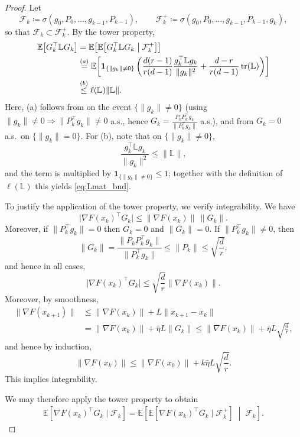 \documentclass[10pt]{article}
\begin{document}
\begin{proof}
Let
\[
\mathcal{F}_k \coloneqq \sigma(g_0,P_0,\dots,g_{k-1},P_{k-1}),
\qquad
\mathcal{F}_k^+ \coloneqq \sigma(g_0,P_0,\dots,g_{k-1},P_{k-1},g_k),
\]
so that $\mathcal{F}_k \subset \mathcal{F}_k^+$.
By the tower property,
\begin{align}
\mathbb{E}\!\left[
G_k^\top \mathbb{L} G_k
\right]
&=
\mathbb{E}\!\left[
\mathbb{E}\!\left[
G_k^\top \mathbb{L} G_k
\;\middle|\;
\mathcal{F}_k^+
\right]
\right]
\notag\\
&\overset{(a)}{=}
\mathbb{E}\!\left[
\mathbf{1}_{\{\|g_k\|\neq 0\}}
\left(
\frac{d(r-1)}{r(d-1)}\frac{g_k^\top \mathbb{L} g_k}{\|g_k\|^2}
+\frac{d-r}{r(d-1)}\operatorname{tr}(\mathbb{L})
\right)
\right]
\notag\\
&\overset{(b)}{\leq}
\ell(\mathbb{L})\|\mathbb{L}\|.
\label{eq:Lmat_bnd}
\end{align}
Here, (a) follows from  on the event $\{\|g_k\|\neq0\}$
(using $\|g_k\|\neq 0 \Rightarrow \|P_k^\top g_k\|\neq 0$ a.s., hence
$G_k=\frac{P_kP_k^\top g_k}{\|P_k^\top g_k\|}$ a.s.), and from $G_k=0$ a.s.\ on
$\{\|g_k\|=0\}$.
For (b), note that on $\{\|g_k\|\neq0\}$,
\[
\frac{g_k^\top \mathbb{L} g_k}{\|g_k\|^2}\le \|\mathbb{L}\|,
\]
and the term is multiplied by $\mathbf{1}_{\{\|g_k\|\neq 0\}}\le 1$; together with
the definition of $\ell(\mathbb{L})$ this yields \eqref{eq:Lmat_bnd}.

To justify the application of the tower property, we verify integrability.
We have
\[
\bigl|\nabla F(x_k)^\top G_k\bigr|
\le
\|\nabla F(x_k)\|\,\|G_k\|.
\]
Moreover, if $\|P_k^\top g_k\|=0$ then $G_k=0$ and $\|G_k\|=0$.
If $\|P_k^\top g_k\|\neq0$, then
\[
\|G_k\|
=
\frac{\|P_kP_k^\top g_k\|}{\|P_k^\top g_k\|}
\le
\|P_k\|
\le
\sqrt{\frac{d}{r}},
\]
and hence in all cases,
\[
\bigl|\nabla F(x_k)^\top G_k\bigr|
\le
\sqrt{\frac{d}{r}}\|\nabla F(x_k)\|.
\]
Moreover, by smoothness,
\begin{align*}
\|\nabla F(x_{k+1})\|
&\le
\|\nabla F(x_k)\|
+ L\|x_{k+1}-x_k\| \\
&=
\|\nabla F(x_k)\|
+ \bar{\eta}L\|G_k\|
\le
\|\nabla F(x_k)\|
+ \bar{\eta}L\sqrt{\frac{d}{r}},
\end{align*}
and hence by induction,
\[
\|\nabla F(x_k)\|
\le
\|\nabla F(x_0)\| + k\bar{\eta}L\sqrt{\frac{d}{r}}.
\]
This implies integrability.

We may therefore apply the tower property to obtain
\begin{align}
\mathbb{E}\!\left[\nabla F(x_k)^\top G_k \mid \mathcal{F}_k\right]
=
\mathbb{E}\!\left[
\mathbb{E}\!\left[\nabla F(x_k)^\top G_k \mid \mathcal{F}_k^+\right]
\;\middle|\;
\mathcal{F}_k
\right].
\label{eq:tower_Gk}
\end{align}


\end{proof}
\end{document}
